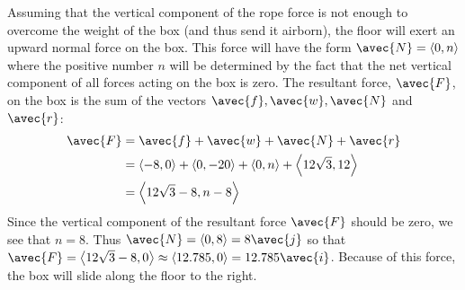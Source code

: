 \documentclass[handout]{ximera}
\begin{document}
\begin{example}
Assuming that the vertical component of the rope force is not enough to overcome the weight of the box (and thus send it airborn), 
the floor will exert an upward normal force on the box.  This force will have the form $\avec{N} = \vector{0, n}$ where the positive 
number $n$ will be determined by the fact that the net vertical component of all forces acting on the box is zero. 
The resultant force, $\avec{F}$, on the box is the sum of the vectors $\avec{f}, \avec{w}, \avec{N}$ and $\avec{r}$:
\begin{align*}
\avec{F} &= \avec{f} + \avec{w} + \avec{N} +  \avec{r} \\
         &= \vector{-8,0} + \vector{0,-20} +\vector{0,n} + \vector{12\sqrt 3, 12} \\
         &= \vector{12\sqrt 3 -8 , n-8}
\end{align*}
Since the vertical component of the resultant force $\avec{F}$ should be zero, we see that $n = 8$. 
Thus $\avec{N} = \vector{0,8} = 8\avec{j}$ so that $\avec{F} = \vector{12\sqrt 3 -8, 0} \approx \vector{12.785,0} = 12.785\avec{i}$. Because of this force, 
the box will slide along the floor to the right.





\end{example}
\end{document}
